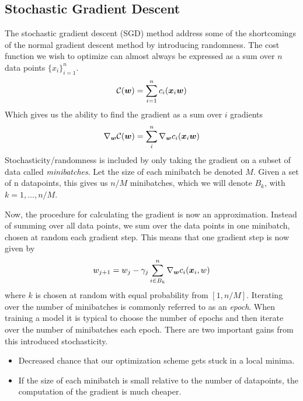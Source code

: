 \subsection{Stochastic Gradient Descent}\label{sec:SGD}
The stochastic gradient descent (SGD) method address some of the shortcomings
of the normal gradient descent method by introducing randomness.
The cost function we wish to optimize can almost always be expressed as a sum
over $n$ data points $\{x_i\}_{i=1}^n$.
\begin{equation}
	\mathcal{C}({\boldsymbol{w}}) = \sum\limits_{i=1}^n c_i ({\boldsymbol{x}}_i{\boldsymbol{w}})
\end{equation}
Which gives us the ability to find the gradient as a sum over $i$ gradients
\begin{equation}
	\nabla_{{\boldsymbol{w}}} \mathcal{C}({\boldsymbol{w}}) = \sum\limits_{i}^n \nabla_{{\boldsymbol{w}}}c_i ({\boldsymbol{x}}_i{\boldsymbol{w}})
\end{equation}
Stochasticity/randomness is included by only taking the gradient on a subset of data
called \textit{minibatches}. Let the size of each minibatch be denoted $M$. Given a
set of n datapoints, this gives us $n/M$ minibatches, which we will denote $B_k$,
with $k = 1, \dots, n/M$.

Now, the procedure for calculating the gradient is now an approximation. Instead of
summing over all data points, we sum over the data points in one minibatch, chosen
at random each gradient step. This means that one gradient step is now given by
\begin{equation}\label{eq:sgd}
	w_{j+1} = w_j - \gamma_j \sum_{i\in B_k}^{n}\nabla_{{\boldsymbol{w}}}c_i({\boldsymbol{x}}_i, w)
\end{equation}
where $k$ is chosen at random with equal probability from $[1, n/M]$.
Iterating over the number of minibatches is commonly referred to as an \textit{epoch}.
When training a model it is typical to choose the number of epochs and then iterate
over the number of minibatches each epoch. There are two important gains from this 
introduced stochasticity.
\begin{itemize}
	\item Decreased chance that our optimization scheme gets stuck in a local minima.
	\item If the size of each minibatch is small relative to the number of datapoints,
	the computation of the gradient is much cheaper.
\end{itemize}

